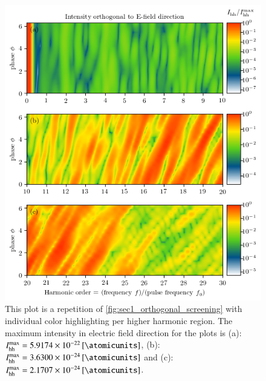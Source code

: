 \documentclass[11pt, a4paper]{scrartcl}
\begin{document}
\begin{figure}[H]
    \centering
    \includegraphics[width=\textwidth]{phase=variable_ortho_split_plot.png}
    \caption{This plot is a repetition of \cref{fig:sec1_orthogonal_screening} with individual color
      highlighting per higher harmonic region. The maximum intensity in electric
      field direction for the plots is (a): $I_{\mathrm{hh}}^{\mathrm{max}} = \SI{5.9174e-22}{[\atomicunits]}$, 
      (b): $I_{\mathrm{hh}}^{\mathrm{max}} = \SI{3.6300e-24}{[\atomicunits]}$ and (c): 
      $I_{\mathrm{hh}}^{\mathrm{max}} = \SI{2.1707e-24}{[\atomicunits]}$.}
    \label{fig:sec1_orthogonal_screening_s}
\end{figure}
\end{document}

